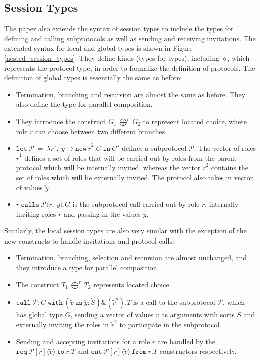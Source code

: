 \documentclass[12pt,twoside]{report}
\begin{document}
\subsection{Session Types}
The paper also extends the syntax of session types to include the types for defining and calling subprotocols as well as sending and receiving invitations. The extended syntax for local and global types is shown in Figure \ref{nested_session_types}. They define kinds (types for types), including $\diamond$, which represents the protocol type, in order to formalize the definition of protocols. The definition of global types is essentially the same as before:
\begin{itemize}
    \item Termination, branching and recursion are almost the same as before. They also define the type for parallel composition.
    \item They introduce the construct $G_1\ \bigoplus^r\ G_2$ to represent located choice, where role $r$ can choose between two different branches. 
    \item $\texttt{let}\ \mathcal{P}\ =\ \lambda\widetilde{r}^1,\ \widetilde{y} \mapsto \texttt{new}\ \widetilde{r}^2.G\ \texttt{in}\ G'$ defines a subprotocol $\mathcal{P}$. The vector of roles $\widetilde{r}^1$ defines a set of roles that will be carried out by roles from the parent protocol which will be internally invited, whereas the vector $\widetilde{r}^2$ contains the set of roles which will be externally invited. The protocol also takes in vector of values $\widetilde{y}$.
    \item $r\ \texttt{calls}\ \mathcal{P}\langle \widetilde{r},\ \widetilde{y}\rangle.G$ is the subprotocol call carried out by role $r$, internally inviting roles $\widetilde{r}$ and passing in the values $\widetilde{y}$.
\end{itemize}{}

Similarly, the local session types are also very similar with the exception of the new constructs to handle invitations and protocol calls:
\begin{itemize}
    \item Termination, branching, selection and recursion are almost unchanged, and they introduce a type for parallel composition. 
    \item The construct $T_1\ \bigoplus^r\ T_2$ represents located choice.
    \item $\texttt{call}\ \mathcal{P}:G\ \texttt{with}\ (\widetilde{v}\ \texttt{as}\ \widetilde{y}:\widetilde{S})\&(\widetilde{r}^2).T$ is a call to the subprotocol $\mathcal{P}$, which has global type $G$, sending a vector of values $\widetilde{v}$ as arguments with sorts $\widetilde{S}$ and externally inviting the roles in $\widetilde{r}^2$ to participate in the subprotocol.
    \item Sending and accepting invitations for a role $r$ are handled by the $\texttt{req}\ \mathcal{P}[r]\langle \widetilde{v} \rangle\ \texttt{to}\ r.T$ and $\texttt{ent}\ \mathcal{P}[r]\langle \widetilde{v} \rangle\ \texttt{from}\ r.T$ constructors respectively.
\end{itemize}{}
\end{document}
